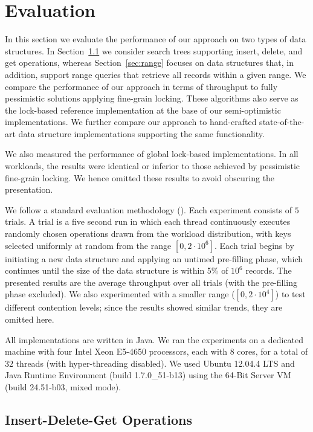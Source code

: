 \section{Evaluation}
\label{sec:eval}

In this section we evaluate the performance of our approach on two types of data
structures. In Section~\ref{sec:readwrite} we consider search trees 
 supporting insert, delete, and get operations, whereas Section~\ref{sec:range}
 focuses on data structures that, in addition, support range queries that retrieve all
records within a given range. We compare the performance of our approach in terms of
throughput to fully pessimistic solutions applying fine-grain locking. These
algorithms also serve as the lock-based reference implementation at the base of
our semi-optimistic implementations. 
We further
compare our approach to hand-crafted state-of-the-art data structure
implementations supporting the same functionality. 

We also measured the performance of global lock-based implementations. 
In all workloads, the results were identical or inferior to those 
achieved by pessimistic fine-grain locking. We hence 
omitted these results to avoid obscuring the presentation.
 
We follow a standard evaluation methodology
(\cite{DrachslerVY2014,NatarajanM2014,BrownER2014,ArbelA2014}). Each experiment
consists of $5$ trials. A trial is a five second run in which each thread continuously executes
randomly chosen operations drawn from the workload distribution, with keys
selected uniformly at random from the range $[0,2\cdot10^6]$.
Each trial begins by initiating a new data structure and applying an untimed pre-filling
phase, which continues until the size of the data structure is within 5\% of
$10^6$ records. The presented results are the average throughput over all trials
(with the pre-filling phase excluded).    
We also experimented with a smaller range ($[0,2\cdot10^4]$) to test different
contention levels; since the results showed similar trends, they are omitted here. 

All implementations are written in Java. We ran the experiments on a dedicated machine with
four Intel Xeon E5-4650 processors, each with $8$ cores, for a total of $32$ threads 
(with hyper-threading disabled). 
We used Ubuntu 12.04.4 LTS and Java Runtime Environment (build
1.7.0\_51-b13) using the 64-Bit Server VM (build 24.51-b03, mixed mode).

\subsection{Insert-Delete-Get Operations}
\label{sec:readwrite} 

